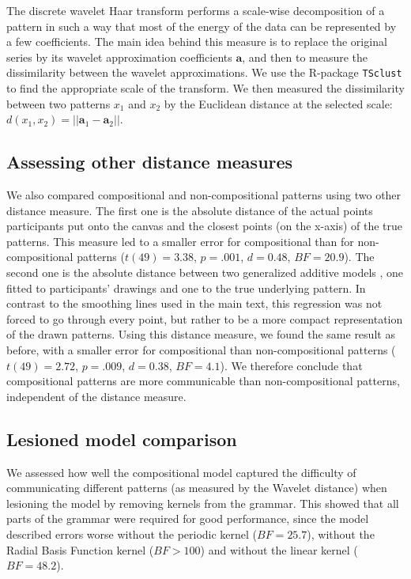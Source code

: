 \documentclass[a4paper,man, floatsintext, natbib]{apa6}
\begin{document}
The discrete wavelet Haar transform performs a scale-wise decomposition of a pattern in such a way that most of the energy of the data can be represented by a few coefficients. The main idea behind this measure is to replace the original series by its wavelet approximation coefficients $\mathbf{a}$, and then to measure the dissimilarity between the wavelet approximations. We use the R-package \texttt{TSclust} \citep{montero2014tsclust} to find the appropriate scale of the transform. We then measured the dissimilarity between two patterns $x_1$ and $x_2$ by the Euclidean distance at the selected scale: $d(x_1, x_2) = ||\mathbf{a}_1-\mathbf{a}_2||$.

\subsection{Assessing other distance measures}

We also compared compositional and non-compositional patterns using two other distance measure. The first one is the absolute distance of the actual points participants put onto the canvas and the closest points (on the x-axis) of the true patterns. This measure led to a smaller error for compositional than for non-compositional patterns ($t(49)=3.38$, $p=.001$, $d=0.48$, $BF=20.9$). The second one is the absolute distance between two generalized additive models \citep{hastie2017generalized}, one fitted to participants' drawings and one to the true underlying pattern. In contrast to the smoothing lines used in the main text, this regression was not forced to go through every point, but rather to be a more compact representation of the drawn patterns. Using this distance measure, we found the same result as before, with a smaller error for compositional than non-compositional patterns ($t(49)=2.72$, $p=.009$, $d=0.38$, $BF=4.1$). We therefore conclude that compositional patterns are more communicable than non-compositional patterns, independent of the distance measure.

\subsection{Lesioned model comparison}
We assessed how well the compositional model captured the difficulty of communicating different patterns (as measured by the Wavelet distance) when lesioning the model by removing kernels from the grammar. This showed that all parts of the grammar were required for good performance, since the model described errors worse without the periodic kernel ($BF=25.7$), without the Radial Basis Function kernel ($BF>100$) and without the linear kernel ($BF=48.2$). 
\end{document}
